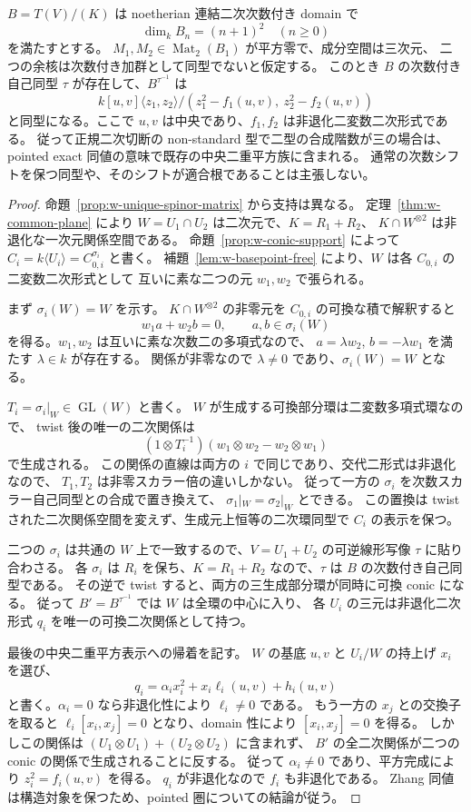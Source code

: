 \begin{theorem}
\label{thm:w-simultaneous-untwist}
$B=T(V)/(K)$ は noetherian 連結二次次数付き domain で
\[
 \dim_k B_n=(n+1)^2\quad(n\ge0)
\]
を満たすとする。
$M_1,M_2\in\operatorname{Mat}_2(B_1)$ が平方零で、成分空間は三次元、
二つの余核は次数付き加群として同型でないと仮定する。
このとき $B$ の次数付き自己同型 $\tau$ が存在して、$B^{\tau^{-1}}$ は
\[
 k[u,v]\langle z_1,z_2\rangle/
 (z_1^2-f_1(u,v),\ z_2^2-f_2(u,v))
\]
と同型になる。ここで $u,v$ は中央であり、$f_1,f_2$ は非退化二変数二次形式である。
従って正規二次切断の non-standard 型で二型の合成階数が三の場合は、
pointed exact 同値の意味で既存の中央二重平方族に含まれる。
通常の次数シフトを保つ同型や、そのシフトが適合根であることは主張しない。
\end{theorem}
\begin{proof}
命題~\ref{prop:w-unique-spinor-matrix} から支持は異なる。
定理~\ref{thm:w-common-plane} により
$W=U_1\cap U_2$ は二次元で、$K=R_1+R_2$、
$K\cap W^{\otimes2}$ は非退化な一次元関係空間である。
命題~\ref{prop:w-conic-support} によって
$C_i=k\langle U_i\rangle=C_{0,i}^{\sigma_i}$ と書く。
補題~\ref{lem:w-basepoint-free} により、$W$ は各 $C_{0,i}$ の二変数二次形式として
互いに素な二つの元 $w_1,w_2$ で張られる。

まず $\sigma_i(W)=W$ を示す。
$K\cap W^{\otimes2}$ の非零元を $C_{0,i}$ の可換な積で解釈すると
\[
 w_1a+w_2b=0,\qquad a,b\in\sigma_i(W)
\]
を得る。$w_1,w_2$ は互いに素な次数二の多項式なので、
$a=\lambda w_2$, $b=-\lambda w_1$ を満たす $\lambda\in k$ が存在する。
関係が非零なので $\lambda\ne0$ であり、$\sigma_i(W)=W$ となる。

$T_i=\sigma_i|_W\in\operatorname{GL}(W)$ と書く。
$W$ が生成する可換部分環は二変数多項式環なので、
twist 後の唯一の二次関係は
\[
 (1\otimes T_i^{-1})(w_1\otimes w_2-w_2\otimes w_1)
\]
で生成される。
この関係の直線は両方の $i$ で同じであり、交代二形式は非退化なので、
$T_1,T_2$ は非零スカラー倍の違いしかない。
従って一方の $\sigma_i$ を次数スカラー自己同型との合成で置き換えて、
$\sigma_1|_W=\sigma_2|_W$ とできる。
この置換は twist された二次関係空間を変えず、生成元上恒等の二次環同型で
$C_i$ の表示を保つ。

二つの $\sigma_i$ は共通の $W$ 上で一致するので、$V=U_1+U_2$ の可逆線形写像
$\tau$ に貼り合わさる。
各 $\sigma_i$ は $R_i$ を保ち、$K=R_1+R_2$ なので、$\tau$ は $B$ の次数付き自己同型である。
その逆で twist すると、両方の三生成部分環が同時に可換 conic になる。
従って $B'=B^{\tau^{-1}}$ では $W$ は全環の中心に入り、
各 $U_i$ の三元は非退化二次形式 $q_i$ を唯一の可換二次関係として持つ。

最後の中央二重平方表示への帰着を記す。
$W$ の基底 $u,v$ と $U_i/W$ の持上げ $x_i$ を選び、
\[
 q_i=\alpha_i x_i^2+x_i\ell_i(u,v)+h_i(u,v)
\]
と書く。$\alpha_i=0$ なら非退化性により $\ell_i\ne0$ である。
もう一方の $x_j$ との交換子を取ると
$\ell_i[x_i,x_j]=0$ となり、domain 性により $[x_i,x_j]=0$ を得る。
しかしこの関係は $(U_1\otimes U_1)+(U_2\otimes U_2)$ に含まれず、
$B'$ の全二次関係が二つの conic の関係で生成されることに反する。
従って $\alpha_i\ne0$ であり、平方完成により
$z_i^2=f_i(u,v)$ を得る。
$q_i$ が非退化なので $f_i$ も非退化である。
Zhang 同値は構造対象を保つため、pointed 圏についての結論が従う。
\end{proof}

